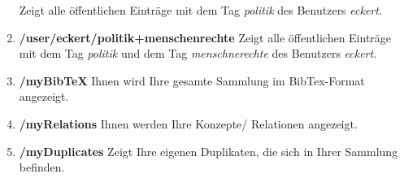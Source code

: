 \documentclass[a4paper,11pt,twoside]{scrbook}
\begin{document}
\begin{enumerate}
    Zeigt alle öffentlichen Einträge mit dem Tag \textit{politik} des Benutzers \textit{eckert}.
    \item \textbf{/user/eckert/politik+menschenrechte} \newline
    Zeigt alle öffentlichen Einträge mit dem Tag \textit{politik} und dem Tag \textit{menschnerechte} des Benutzers \textit{eckert}.
     \item \textbf{/myBibTeX} \newline
    Ihnen wird Ihre gesamte Sammlung im BibTex-Format angezeigt.
    \item \textbf{/myRelations} \newline
    Ihnen werden Ihre Konzepte/ Relationen angezeigt.
    \item \textbf{/myDuplicates} \newline
    Zeigt Ihre eigenen Duplikaten, die sich in Ihrer Sammlung befinden.
\end{enumerate}
    
\end{document}
